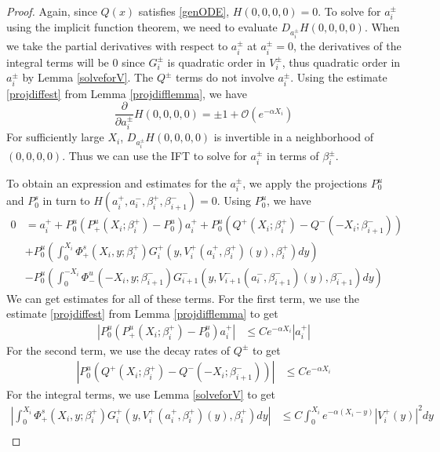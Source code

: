 \documentclass[thesis.tex]{subfiles}
\begin{document}
\begin{lemma}
\begin{proof}
Again, since $Q(x)$ satisfies \eqref{genODE}, $H(0, 0, 0, 0) = 0$. To  solve for $a_i^\pm$ using the implicit function theorem, we need to evaluate $D_{a_i^\pm} H(0, 0, 0, 0)$. When we take the partial derivatives with respect to $a_i^\pm$ at $a_i^\pm = 0$, the derivatives of the integral terms will be 0 since $G_i^\pm$ is quadratic order in $V_i^\pm$, thus quadratic order in $a_i^\pm$ by Lemma \ref{solveforV}. The $Q^\pm$ terms do not involve $a_i^\pm$. Using the estimate \eqref{projdiffest} from Lemma \ref{projdifflemma}, we have 
\[
\frac{\partial}{\partial a_i^\pm} H(0, 0, 0, 0) = \pm 1 + \mathcal{O} (e^{-\alpha X_i})
\]
For sufficiently large $X_i$, $D_{a_i^\pm} H(0, 0, 0, 0)$ is invertible in a neighborhood of $(0, 0, 0, 0)$. Thus we can use the IFT to solve for $a_i^\pm$ in terms of $\beta_i^\pm$. 

To obtain an expression and estimates for the $a_i^\pm$, we apply the projections $P^u_0$ and $P^s_0$ in turn to $H(a_i^+, a_i^-, \beta_i^+, \beta_{i+1}^-) = 0$. Using $P^u_0$, we have
\begin{equation}\label{Ps0aiplus}
\begin{aligned}
0 &= a_i^+ + P^u_0(P^u_+(X_i; \beta_i^+) -  P^u_0)a_i^+ 
+ P^u_0 \left( Q^+(X_i; \beta_i^+) - Q^-(-X_i; \beta_{i+1}^-) \right)\\
&+ P^u_0 \left( \int_0^{X_i} \Phi_+^s(X_i, y; \beta_i^+) G_i^+(y, V_i^+(a_i^+, \beta_i^+)(y),\beta_i^+)dy \right) \\
&- P^u_0 \left( \int_0^{-X_i} \Phi_-^u(-X_i, y; \beta_{i+1}^-) G_{i+1}^-(y, V_{i+1}^-(a_i^-, \beta_{i+1}^-)(y),\beta_{i+1}^-) dy \right)
\end{aligned}
\end{equation}
We can get estimates for all of these terms. For the first term, we use the estimate \eqref{projdiffest} from Lemma \ref{projdifflemma} to get 
\begin{align*}
|P^u_0(P^u_+(X_i; \beta_i^+) -  P^u_0)a_i^+ | &\leq C e^{-\alpha X_i} |a_i^+|
\end{align*}
For the second term, we use the decay rates of $Q^\pm$ to get
\begin{align*}
|P^u_0 \left( Q^+(X_i; \beta_i^+) - Q^-(-X_i; \beta_{i+1}^-)  \right)| &\leq C e^{-\alpha X_i}
\end{align*}
For the integral terms, we use Lemma \ref{solveforV} to get
\begin{align*}
\left| \int_0^{X_i} \Phi_+^s(X_i, y; \beta_i^+) G_i^+(y, V_i^+(a_i^+, \beta_i^+)(y),\beta_i^+)dy \right| &\leq C \int_0^{X_i}e^{-\alpha(X_i - y)} |V_i^+(y)|^2 dy \\

\end{align*}
\end{proof}
\end{lemma}
\end{document}
